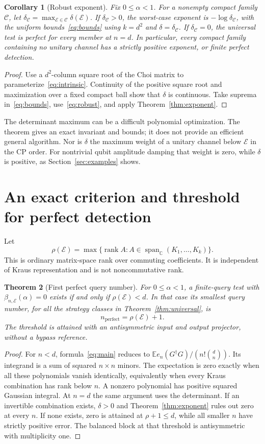 \documentclass[11pt,a4paper]{article}
\newtheorem{theorem}{Theorem}[section]
\newtheorem{corollary}[theorem]{Corollary}
\theoremstyle{remark}\newtheorem{remark}[theorem]{Remark}
\DeclareMathOperator{\rank}{rank}
\newcommand{\E}{\mathcal E}
\newcommand{\C}{\mathcal C}
\newcommand{\EE}{\mathbb E}
\newcommand{\CC}{\mathbb C}
\begin{document}
\begin{corollary}[Robust exponent]\label{cor:robust-exp}
Fix $0\le\alpha<1$. For a nonempty compact family $\C$, let $\delta_\C=\max_{\E\in\C}\delta(\E)$. If $\delta_\C>0$, the worst-case exponent is $-\log\delta_\C$, with the uniform bounds~\eqref{eq:bounds} using $k=d^2$ and $\delta=\delta_\C$. If $\delta_\C=0$, the universal test is perfect for every member at $n=d$. In particular, every compact family containing no unitary channel has a strictly positive exponent, or finite perfect detection.
\end{corollary}
\begin{proof}
Use a $d^2$-column square root of the Choi matrix to parameterize~\eqref{eq:intrinsic}. Continuity of the positive square root and maximization over a fixed compact ball show that $\delta$ is continuous. Take suprema in~\eqref{eq:bounds}, use~\eqref{eq:robust}, and apply Theorem~\ref{thm:exponent}.
\end{proof}

The determinant maximum can be a difficult polynomial optimization. The theorem gives an exact invariant and bounds; it does not provide an efficient general algorithm. Nor is $\delta$ the maximum weight of a unitary channel below $\E$ in the CP order. For nontrivial qubit amplitude damping that weight is zero, while $\delta$ is positive, as Section~\ref{sec:examples} shows.

\section{An exact criterion and threshold for perfect detection}
Let
\[
\rho(\E)=\max\{\rank A:A\in\operatorname{span}_{\CC}(K_1,\ldots,K_k)\}.
\]
This is ordinary matrix-space rank over commuting coefficients. It is independent of Kraus representation and is not noncommutative rank.

\begin{theorem}[First perfect query number]\label{thm:perfect}
For $0\le\alpha<1$, a finite-query test with $\beta_{n,\E}(\alpha)=0$ exists if and only if $\rho(\E)<d$. In that case its smallest query number, for all the strategy classes in Theorem~\ref{thm:universal}, is
\begin{equation}
n_{\mathrm{perfect}}=\rho(\E)+1.
\end{equation}
The threshold is attained with an antisymmetric input and output projector, without a bypass reference.
\end{theorem}
\begin{proof}
For $n<d$, formula~\eqref{eq:main} reduces to $\EE e_n(G^\dagger G)/(n!\binom dn)$. Its integrand is a sum of squared $n\times n$ minors. The expectation is zero exactly when all these polynomials vanish identically, equivalently when every Kraus combination has rank below $n$. A nonzero polynomial has positive squared Gaussian integral. At $n=d$ the same argument uses the determinant. If an invertible combination exists, $\delta>0$ and Theorem~\ref{thm:exponent} rules out zero at every $n$. If none exists, zero is attained at $\rho+1\le d$, while all smaller $n$ have strictly positive error. The balanced block at that threshold is antisymmetric with multiplicity one.
\end{proof}
\end{document}
